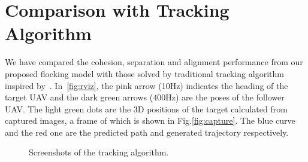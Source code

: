 \section{Comparison with Tracking Algorithm}

We have compared the cohesion, separation and alignment performance from our proposed flocking model with those solved by traditional tracking algorithm inspired by~\cite{Chenjing}. In~\ref{fig:rviz}, the pink arrow (10Hz) indicates the heading of the target UAV and the dark green arrows (400Hz) are the poses of the follower UAV. The light green dots are the 3D positions of the target calculated from captured images, a frame of which is shown in Fig.\ref{fig:capture}. The blue curve and the red one are the predicted path and generated trajectory respectively.

\begin{figure}[htb]
  \centering
  \caption{Screenshots of the tracking algorithm.}\label{fig:rviz_capture}
\end{figure}

